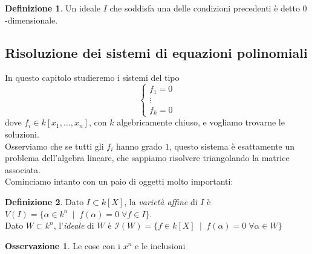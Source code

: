 \documentclass[a4paper,10pt]{article}
\theoremstyle{plain}
\theoremstyle{definition}
\newtheorem{defn}{Definizione}[section]
\newtheorem*{oss}{Osservazione}
\DeclareMathOperator{\st}{\; |\;}
\begin{document}
\begin{defn}
    Un ideale $I$ che soddisfa una delle condizioni precedenti è detto $0$-dimensionale.
\end{defn}

\subsection{Risoluzione dei sistemi di equazioni polinomiali}
In questo capitolo studieremo i sistemi del tipo $$\begin{cases}
    f_1=0\\
    \vdots\\
    f_k=0
\end{cases}$$
dove $f_i\in k[x_1,\dots,x_n]$, con $k$ algebricamente chiuso, e vogliamo trovarne le soluzioni.\\
Osserviamo che se tutti gli $f_i$ hanno grado $1$, questo sistema è esattamente un problema dell'algebra lineare, che sappiamo risolvere triangolando la matrice associata.\\
Cominciamo intanto con un paio di oggetti molto importanti:
\begin{defn}
    Dato $I\subset k[X]$, la \emph{varietà affine} di $I$ è $V(I)=\{\alpha\in k^n\st f(\alpha)=0\;\forall f\in I\}$.\\
    Dato $W\subset k^n$, l'\emph{ideale} di $W$ è $\mathcal{I}(W)=\{f\in k[X]\st f(\alpha)=0\;\forall\alpha\in W\}$
\end{defn}
\begin{oss}
    Le cose con i $x^n$ e le inclusioni
\end{oss}
\end{document}
